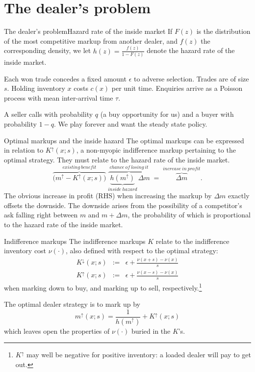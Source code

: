 \documentclass[10pt]{beamer}
\newcommand{\blue}[1]{\textcolor{pcblue}{#1}}
\begin{document}
\section{The dealer's problem}

\begin{frame}{The dealer's problem}{Hazard rate of the inside market}
If $F(z)$ is the distribution of the most competitive markup from another dealer, and $f(z)$ the corresponding density, we let $h(z) = \frac{f(z)}{1-F(z)}$ denote the hazard rate of the inside market.
\vspace{1em}

Each won trade concedes a fixed amount $\epsilon$ to adverse selection. Trades are of size $s$. Holding inventory $x$ costs $c(x)$ per unit time. Enquiries arrive as a Poisson process with mean inter-arrival time $\tau$.
\vspace{1em}

A seller calls with probability $q$ (a buy opportunity for us) and a buyer with probability $1-q$. We play forever and want the steady state policy.
\end{frame}

\begin{frame}{Optimal markups and the inside hazard}
The optimal markups can be expressed in relation to $K^{\uparrow}(x;s)$, a non-myopic \blue{indifference markup} pertaining to the optimal strategy. They must relate to the hazard rate of the inside market.
\[
\overbrace{\big(m^{\uparrow} - K^{\uparrow}(x;s)\big)}^{existing\ benefit}\;
\overbrace{\underbrace{h(m^{\uparrow})}_{inside\ hazard}\,\Delta m}^{chance\ of\ losing\ it}
\;=\;
\overbrace{\Delta m}^{increase\ in\ profit} .
\]
The obvious increase in profit (RHS) when increasing the markup by $\Delta m$ exactly offsets the downside. The downside arises from the possibility of a competitor's ask falling right between $m$ and $m+\Delta m$, the probability of which is proportional to the hazard rate of the inside market.
\end{frame}

\begin{frame}{Indifference markups}
The indifference markups $K$ relate to the indifference inventory cost $\nu(\cdot)$, also defined with respect to the optimal strategy:
\begin{eqnarray}
K^{\downarrow}(x;s) & := & \epsilon + \frac{\nu(x+s) - \nu(x)}{s} \\
K^{\uparrow}(x;s) & := & \epsilon + \frac{\nu(x-s) - \nu(x)}{s}
\end{eqnarray}
when marking down to buy, and marking up to sell, respectively.\footnote{$K^{\uparrow}$ may well be negative for positive inventory: a loaded dealer will pay to get out.}
\vspace{1em}

The optimal dealer strategy is to mark up by
\[
m^{\uparrow}(x;s) = \frac{1}{h(m^{\uparrow})} + K^{\uparrow}(x;s)
\]
which leaves open the properties of $\nu(\cdot)$ buried in the $K$'s.
\end{frame}
\end{document}
